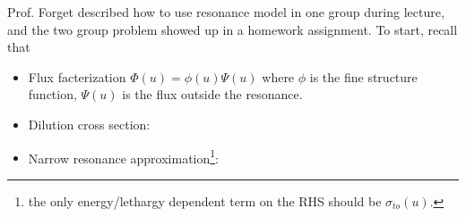\documentclass{school-22.211-notes}
\begin{document}
\clearpage
{}
Prof. Forget described how to use resonance model in one group during lecture, and the two group problem showed up in a homework assignment. To start, recall that
\begin{itemize}
\item Flux facterization $\Phi(u) = \phi(u) \Psi(u)$ where $\phi$ is the fine structure function, $\Psi(u)$ is the flux outside the resonance. 
\item Dilution cross section: 
\item Narrow resonance approximation\footnote{the only energy/lethargy dependent term on the RHS should be $\sigma_{to}(u)$.}:
\end{itemize}
\end{document}
